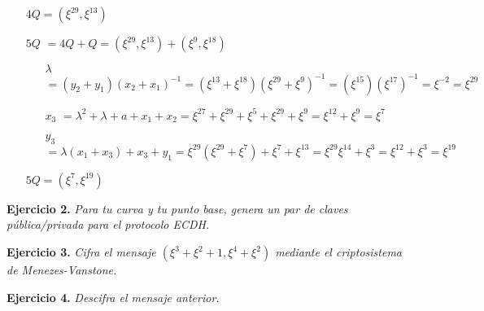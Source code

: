 \documentclass[fleqn]{article}
\begin{document}
\begin{itemize}
\begin{itemize}
            \end{itemize}
            $4Q = (\xi^{29}, \xi^{13})$
        \item[$5Q$] $ = 4Q + Q = (\xi^{29}, \xi^{13}) + (\xi^9, \xi^{18})$
            \begin{itemize}
                \item[$\lambda$] $ = (y_2 + y_1)(x_2 + x_1)^{-1} = (\xi^{13} + \xi^{18})(\xi^{29} + \xi^{9})^{-1} = (\xi^{15})(\xi^{17})^{-1} = \xi^{-2} = \xi^{29}$
                \item[$x_3$] $ = \lambda^2 + \lambda + a + x_1 + x_2 = \xi^{27} + \xi^{29} + \xi^{5} + \xi^{29} + \xi^{9} = \xi^{12} + \xi^{9} = \xi^{7}$
                \item[$y_3$] $ = \lambda(x_1 + x_3) + x_3 + y_1 = \xi^{29}(\xi^{29} + \xi^{7}) + \xi^{7} + \xi^{13} = \xi^{29}\xi^{14} + \xi^{3} = \xi^{12} + \xi^{3} = \xi^{19}$
            \end{itemize}
            $5Q = (\xi^{7}, \xi^{19})$
    \end{itemize}

    \newpage
    \textbf{Ejercicio 2. }\textit{Para tu curva y tu punto base, genera un par de claves pública/privada para el protocolo ECDH.}
    \vspace{0.5cm}


    \newpage
    \textbf{Ejercicio 3. }\textit{Cifra el mensaje $(\xi^3 + \xi^2 + 1, \xi^4 + \xi^2)$ mediante el criptosistema de Menezes-Vanstone.}
    \vspace{0.5cm}


    \newpage
    \textbf{Ejercicio 4. }\textit{Descifra el mensaje anterior.}
\end{document}
